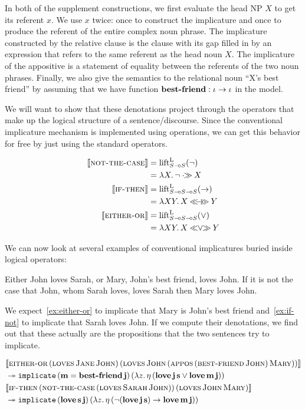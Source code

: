 In both of the supplement constructions, we first evaluate the head NP $X$
to get its referent $x$. We use $x$ twice: once to construct the
implicature and once to produce the referent of the entire complex noun
phrase. The implicature constructed by the relative clause is the clause
with its gap filled in by an expression that refers to the same referent as
the head noun $X$. The implicature of the appositive is a statement of
equality between the referents of the two noun phrases. Finally, we also
give the semantics to the relational noun ``X's best friend'' by assuming
that we have function $\textbf{best-friend} : \iota \to \iota$ in the model.

We will want to show that these denotations project through the operators
that make up the logical structure of a sentence/discourse. Since the
conventional implicature mechanism is implemented using operations, we can
get this behavior for free by just using the standard operators.

\begin{align*}
  \lex{not-the-case}{\liftl_{S \limp S}(\lnot)} \\
  &= \lam{X}{\lnot \apr X} \\
  \lex{if-then}{\liftl_{S \limp S \limp S}(\to)} \\
  &= \lam{X Y}{X \implr Y} \\
  \lex{either-or}{\liftl_{S \limp S \limp S}(\lor)} \\
  &= \lam{X Y}{X \orlr Y}
\end{align*}

We can now look at several examples of conventional implicatures buried
inside logical operators:

\begin{exe}
  \ex Either John loves Sarah, or Mary, John's best friend, loves John. \label{ex:either-or}
  \ex If it is not the case that John, whom Sarah loves, loves Sarah then Mary loves John. \label{ex:if-not}
\end{exe}

We expect~\eqref{ex:either-or} to implicate that Mary is John's best friend
and~\eqref{ex:if-not} to implicate that Sarah loves John. If we compute
their denotations, we find out that these actually are the propositions
that the two sentences try to implicate.

\NoChapterPrefix
\begin{align}
  & \llbracket \textsc{either-or}\,(\textsc{loves}\,\textsc{Jane}\,\textsc{John})\,(\textsc{loves}\,\textsc{John}\,(\textsc{appos}\,(\textsc{best-friend}\,\textsc{John})\,\textsc{Mary})) \rrbracket \nonumber \\
  & \twoheadrightarrow \mathtt{implicate}\,(\textbf{m} = \textbf{best-friend}\,\textbf{j})\,(\lambda z.\, \eta\,(\textbf{love}\,\textbf{j}\,\textbf{s} \lor \textbf{love}\,\textbf{m}\,\textbf{j})) \\
  & \llbracket \textsc{if-then}\,(\textsc{not-the-case}\,(\textsc{loves}\,\textsc{Sarah}\,\textsc{John}))\,(\textsc{loves}\,\textsc{John}\,\textsc{Mary}) \rrbracket \nonumber \\
  & \twoheadrightarrow \mathtt{implicate}\,(\textbf{love}\,\textbf{s}\,\textbf{j})\,(\lambda z.\, \eta\,(\lnot(\textbf{love}\,\textbf{j}\,\textbf{s}) \to \textbf{love}\,\textbf{m}\,\textbf{j}))
\end{align}
\ChapterPrefix

